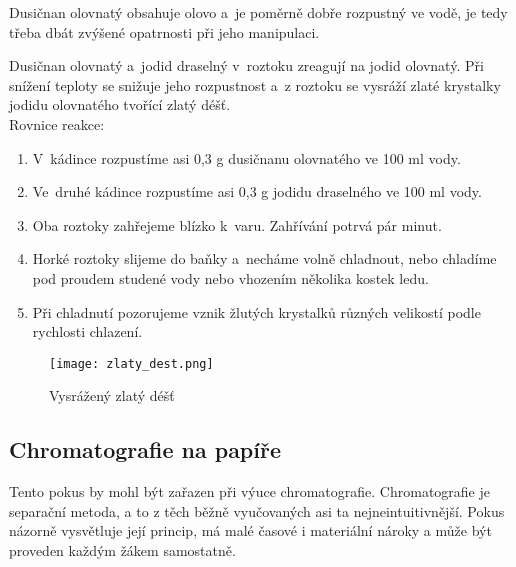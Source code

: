 \hspace{-21pt} 

Dusičnan olovnatý obsahuje olovo a~je poměrně dobře rozpustný ve vodě, je tedy třeba dbát zvýšené opatrnosti při jeho manipulaci.\\

\hspace{-21pt} 

Dusičnan olovnatý a~jodid draselný v~roztoku zreagují na jodid olovnatý. Při snížení teploty se snižuje jeho rozpustnost a~z roztoku se vysráží zlaté krystalky jodidu olovnatého tvořící zlatý déšť.\\

Rovnice reakce: \\

\hspace{-21pt} 

\begin{enumerate}
  \item V~kádince rozpustíme asi 0,3 g dusičnanu olovnatého ve 100 ml vody.
  \item Ve~druhé kádince rozpustíme asi 0,3 g jodidu draselného ve 100 ml vody.
  \item Oba roztoky zahřejeme blízko k~varu. Zahřívání potrvá pár minut.
  \item Horké roztoky slijeme do baňky a~necháme volně chladnout, nebo chladíme pod proudem studené vody nebo vhozením několika kostek ledu.
  \item Při chladnutí pozorujeme vznik žlutých krystalků různých velikostí podle rychlosti chlazení.
\end{enumerate}

\begin{figure}[h]
    \centering
    \texttt{[image: zlaty\_dest.png]}
    \caption{Vysrážený zlatý déšť}
\end{figure}

\subsection{Chromatografie na papíře}


Tento pokus by mohl být zařazen při výuce chromatografie. Chromatografie je separační metoda, a to z těch běžně vyučovaných asi ta nejneintuitivnější. Pokus názorně vysvětluje její princip, má malé časové i materiální nároky a může být proveden každým žákem samostatně.\\

